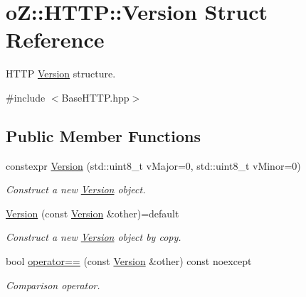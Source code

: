 \hypertarget{structo_z_1_1_h_t_t_p_1_1_version}{}\section{oZ\+::H\+T\+TP\+::Version Struct Reference}
\label{structo_z_1_1_h_t_t_p_1_1_version}


H\+T\+TP \mbox{\hyperlink{structo_z_1_1_h_t_t_p_1_1_version}{Version}} structure.  




{\ttfamily \#include $<$Base\+H\+T\+T\+P.\+hpp$>$}

\subsection*{Public Member Functions}
\begin{DoxyCompactItemize}
\item 
\mbox{\label{structo_z_1_1_h_t_t_p_1_1_version_a3531840398b7bd19cf9196792f81f23d}} 
constexpr \mbox{\hyperlink{structo_z_1_1_h_t_t_p_1_1_version_a3531840398b7bd19cf9196792f81f23d}{Version}} (std\+::uint8\+\_\+t v\+Major=0, std\+::uint8\+\_\+t v\+Minor=0)
\begin{DoxyCompactList}\small\item\em Construct a new \mbox{\hyperlink{structo_z_1_1_h_t_t_p_1_1_version}{Version}} object. \end{DoxyCompactList}\item 
\mbox{\label{structo_z_1_1_h_t_t_p_1_1_version_a88ccde399b6f5311dac079843da8dae1}} 
\mbox{\hyperlink{structo_z_1_1_h_t_t_p_1_1_version_a88ccde399b6f5311dac079843da8dae1}{Version}} (const \mbox{\hyperlink{structo_z_1_1_h_t_t_p_1_1_version}{Version}} \&other)=default
\begin{DoxyCompactList}\small\item\em Construct a new \mbox{\hyperlink{structo_z_1_1_h_t_t_p_1_1_version}{Version}} object by copy. \end{DoxyCompactList}\item 
\mbox{\label{structo_z_1_1_h_t_t_p_1_1_version_a6d985577db3b920c4efa2a03c46b827b}} 
bool \mbox{\hyperlink{structo_z_1_1_h_t_t_p_1_1_version_a6d985577db3b920c4efa2a03c46b827b}{operator==}} (const \mbox{\hyperlink{structo_z_1_1_h_t_t_p_1_1_version}{Version}} \&other) const noexcept
\begin{DoxyCompactList}\small\item\em Comparison operator. \end{DoxyCompactList}\end{DoxyCompactItemize}
